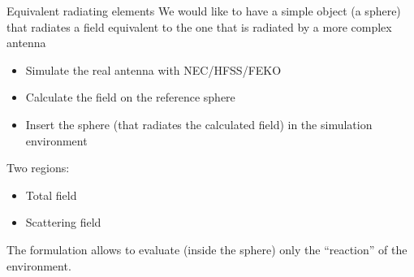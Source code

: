 \documentclass{beamer}
\begin{document}
\begin{frame}[fragile]{Equivalent radiating elements}
    We would like to have a simple object (a sphere) that radiates a field equivalent to the one that is radiated by a more complex antenna
    \pause
    \begin{itemize}
        \item Simulate the real antenna with NEC/HFSS/FEKO
        \item Calculate the field on the reference sphere
        \item Insert the sphere (that radiates the calculated field) in the simulation environment
    \end{itemize}
    
    \pause
    \begin{minipage}{0.59\textwidth}
        Two regions:
        \begin{itemize}
            \item Total field
            \item Scattering field
        \end{itemize}
        The formulation allows to evaluate (inside the sphere) only the ``reaction'' of the environment.
    \end{minipage}
    \hspace{1cm}
\end{frame}
\end{document}
